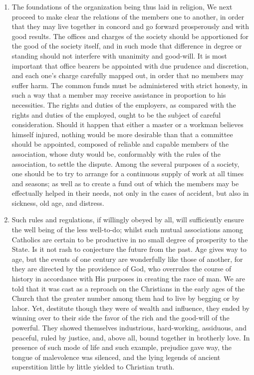 \documentclass{book}
\begin{document}
\begin{enumerate}
	\item The foundations of the organization being thus laid in religion, We next proceed to make clear the relations of the members one to another, in order that they may live together in concord and go forward prosperously and with good results. The offices and charges of the society should be apportioned for the good of the society itself, and in such mode that difference in degree or standing should not interfere with unanimity and good-will. It is most important that office bearers be appointed with due prudence and discretion, and each one’s charge carefully mapped out, in order that no members may suffer harm. The common funds must be administered with strict honesty, in such a way that a member may receive assistance in proportion to his necessities. The rights and duties of the employers, as compared with the rights and duties of the employed, ought to be the subject of careful consideration. Should it happen that either a master or a workman believes himself injured, nothing would be more desirable than that a committee should be appointed, composed of reliable and capable members of the association, whose duty would be, conformably with the rules of the association, to settle the dispute. Among the several purposes of a society, one should be to try to arrange for a continuous supply of work at all times and seasons; as well as to create a fund out of which the members may be effectually helped in their needs, not only in the cases of accident, but also in sickness, old age, and distress.


	\item Such rules and regulations, if willingly obeyed by all, will sufficiently ensure the well being of the less well-to-do; whilst such mutual associations among Catholics are certain to be productive in no small degree of prosperity to the State. Is it not rash to conjecture the future from the past. Age gives way to age, but the events of one century are wonderfully like those of another, for they are directed by the providence of God, who overrules the course of history in accordance with His purposes in creating the race of man. We are told that it was cast as a reproach on the Christians in the early ages of the Church that the greater number among them had to live by begging or by labor. Yet, destitute though they were of wealth and influence, they ended by winning over to their side the favor of the rich and the good-will of the powerful. They showed themselves industrious, hard-working, assiduous, and peaceful, ruled by justice, and, above all, bound together in brotherly love. In presence of such mode of life and such example, prejudice gave way, the tongue of malevolence was silenced, and the lying legends of ancient superstition little by little yielded to Christian truth.



\end{enumerate}
\end{document}
